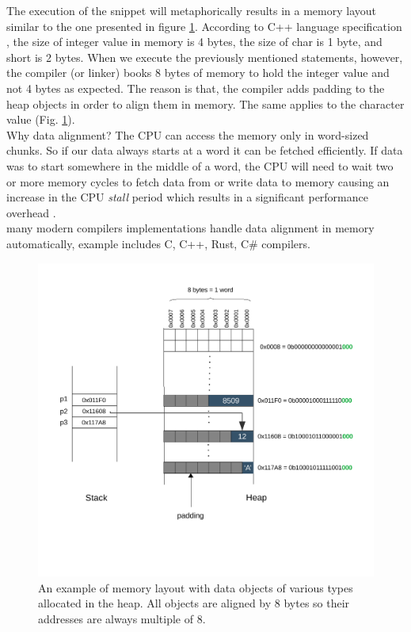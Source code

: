 The execution of the snippet will metaphorically results in a memory layout similar to the one presented in figure \ref{fig:data_aligntment}. According to C++ language specification \cite{cpp}, the size of integer value in memory is 4 bytes, the size of char is 1 byte, and short is 2 bytes. When we execute the previously mentioned statements, however, the compiler (or linker) books 8 bytes of memory to hold the integer value and not 4 bytes as expected. The reason is that, the compiler adds padding to the heap objects in order to align them in memory. The same applies to the character value (Fig. \ref{fig:data_aligntment}).  \\

Why data alignment? The CPU can access the memory only in word-sized chunks. So if our data always starts at a word it can be fetched efficiently. If data was to start somewhere in the middle of a word, the CPU will need to wait two or more memory cycles to fetch data from or write data to memory causing an increase in the CPU \textit{stall} period which results in a significant performance overhead  \cite{OSConcept}. \\


many modern compilers implementations handle data alignment in memory automatically, example includes C, C++, Rust, C\# compilers.

\begin{figure}
	\centering
	\includegraphics[scale=0.8]{figures/chapter2/memorylayout}
	\caption{An example of memory layout with data objects of various types allocated in the heap. All objects are aligned by 8 bytes so their addresses are always multiple of 8.}
	\label{fig:data_aligntment}
\end{figure}

